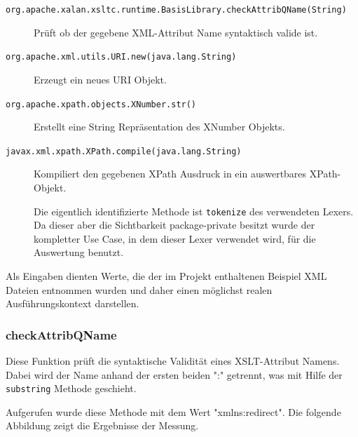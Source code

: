 \begin{description}
	\item [\texttt{org.apache.xalan.xsltc.runtime.BasisLibrary.checkAttribQName(String)}]
		Prüft ob der gegebene XML-Attribut Name syntaktisch valide ist.
	\item [\texttt{org.apache.xml.utils.URI.new(java.lang.String)}]
		Erzeugt ein neues URI Objekt. 
	\item [\texttt{org.apache.xpath.objects.XNumber.str()}]
		Erstellt eine String Repräsentation des XNumber Objekts.
	\item [\texttt{javax.xml.xpath.XPath.compile(java.lang.String)}]
		Kompiliert den gegebenen XPath Ausdruck in ein auswertbares XPath-Objekt.
		
		Die eigentlich identifizierte Methode ist \texttt{tokenize} des verwendeten 
		Lexers. Da dieser aber die Sichtbarkeit package-private
		besitzt wurde der kompletter Use Case, in dem dieser Lexer verwendet wird, 
		für die Auswertung benutzt.
\end{description}

Als Eingaben dienten Werte, die der im Projekt enthaltenen Beispiel XML Dateien entnommen wurden 
und daher einen möglichst realen Ausführungskontext darstellen.

\subsubsection{checkAttribQName}

Diese Funktion prüft die syntaktische Validität eines XSLT-Attribut Namens. Dabei wird 
der Name anhand der ersten beiden ":" getrennt, was mit Hilfe der \texttt{substring} Methode
geschieht. 

Aufgerufen wurde diese Methode mit dem Wert "xmlns:redirect". Die folgende Abbildung zeigt 
die Ergebnisse der Messung.

